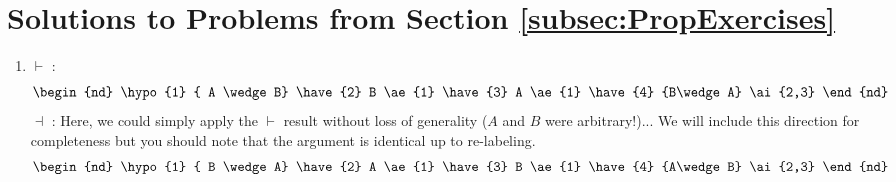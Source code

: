 \section{Solutions to Problems from Section \ref{subsec:PropExercises}}
\begin{enumerate}
    \item $\vdash$ :
    \begin{equation}
        \begin{nd}
        \hypo{1} { A \wedge B}
        \have{2} B \ae{1}
        \have{3} A \ae{1}
        \have{4} {B\wedge A} \ai{2,3}
        \end{nd} \nonumber
    \end{equation}
    $\dashv$ :
    Here, we could simply apply the $\vdash$ result without loss of generality ($A$ and $B$ were arbitrary!)... We will include this direction for completeness but you should note that the argument is identical up to re-labeling.
    \begin{equation}
        \begin{nd}
        \hypo{1} { B \wedge A}
        \have{2} A \ae{1}
        \have{3} B \ae{1}
        \have{4} {A\wedge B} \ai{2,3}
        \end{nd} \nonumber
    \end{equation}


\end{enumerate}
